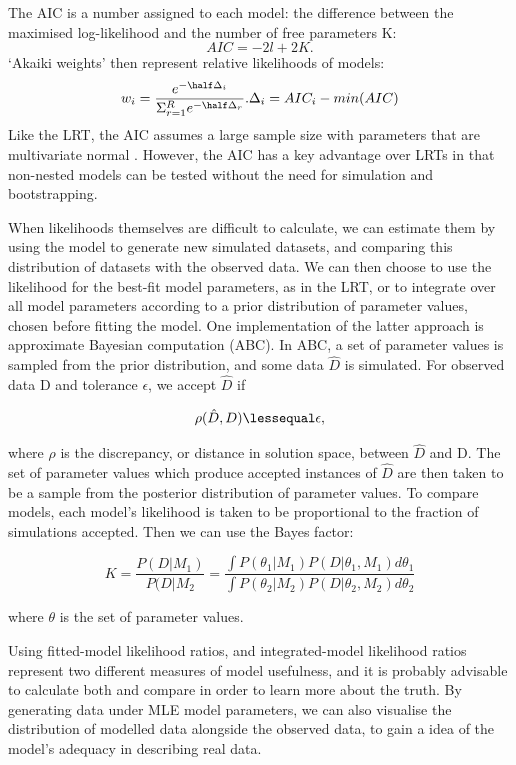 \documentclass[12pt]{article}
\begin{document}
The AIC is a number assigned to each model: the difference between the maximised log-likelihood and the number of free parameters K:
\begin{equation}
	AIC = -2l + 2K.
\end{equation}
`Akaiki weights' then represent relative likelihoods of models:
\begin{equation}
	w_i = \frac{e^{-\half \Delta_i}}{\Sigma^R_{r=1} e^{- \half \Delta_r}}.
	\Delta_i = AIC_i - min(AIC)
\end{equation}
Like the LRT, the AIC assumes a large sample size with parameters that are multivariate normal \citep{posada_model_2004}. 
However, the AIC has a key advantage over LRTs in that non-nested models can be tested without the need for simulation and bootstrapping.

When likelihoods themselves are difficult to calculate, we can estimate them by using the model to generate new simulated datasets, and comparing this distribution of datasets with the observed data. 
We can then choose to use the likelihood for the best-fit model parameters, as in the LRT, or to integrate over all model parameters according to a prior distribution of parameter values, chosen before fitting the model. One implementation of the latter approach is approximate Bayesian computation (ABC). 
In ABC, a set of parameter values is sampled from the prior distribution, and some data $\hat{D}$ is simulated. For observed data D and tolerance $\epsilon$, we accept $\hat{D}$ if

\begin{equation}
	\rho (\hat{D}, D) \lessequal \epsilon,
\end{equation}

where $\rho$ is the discrepancy, or distance in solution space, between $\hat{D}$ and D. 
The set of parameter values which produce accepted instances of $\hat{D}$ are then  taken to be a sample from the posterior distribution of parameter values. 
To compare models, each model's likelihood is taken to be proportional to the fraction of simulations accepted. Then we can use the Bayes factor:

\begin{equation}
	K = \frac{P(D|M_1)}{P(D|M_2} = \frac{\int P(\theta_1|M_1)P(D|\theta_1, M_1) d\theta_1}{\int P(\theta_2|M_2)P(D|\theta_2, M_2) d\theta_2}
\end{equation}

where $\theta$ is the set of parameter values.

Using fitted-model likelihood ratios, and integrated-model likelihood ratios represent two different measures of model usefulness, and it is probably advisable to calculate both and compare in order to learn more about the truth.
By generating data under MLE model parameters, we can also visualise the distribution of modelled data alongside the observed data, to gain a idea of the model's adequacy in describing real data. 
\end{document}
